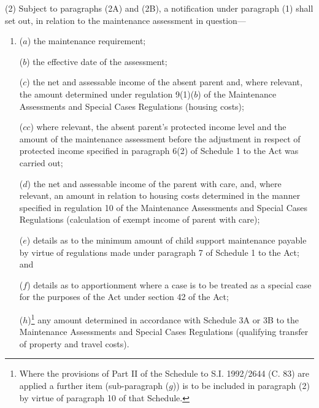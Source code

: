 \documentclass[a4paper]{article}
\begin{document}
(2) 
Subject to 
  paragraphs (2A) and (2B),  %
a notification under paragraph (1)  %
shall set out, in relation to the maintenance assessment in question—
\begin{enumerate}\item[]
($a$) the maintenance requirement;

($b$) the effective date of the assessment;


($c$) the net and assessable income of the absent parent and, where relevant, the amount determined under regulation 9(1)($b$) of the Maintenance Assessments and Special Cases Regulations (housing costs);

($cc$) where relevant, the absent parent’s protected income level and the amount of the maintenance assessment before the adjustment in respect of protected income specified in paragraph 6(2) of Schedule 1 to the Act was carried out;


($d$) the net and assessable income of the parent with care, and, where relevant, an amount in relation to housing costs determined in the manner specified in regulation 10 of the Maintenance Assessments and Special Cases Regulations (calculation of exempt income of parent with care);

($e$) details as to the minimum amount of child support maintenance payable by virtue of regulations made under paragraph 7 of Schedule 1 to the Act; and

($f$) details as to apportionment where a case is to be treated as a special case for the purposes of the Act under section 42 of the Act;

($h$)\footnote{\frenchspacing Where the provisions of Part II of the Schedule to S.I. 1992/2644 (C. 83) are applied a further item (sub-paragraph ($g$)) is to be included in paragraph (2) by virtue of paragraph 10 of that Schedule.} any amount determined in accordance with Schedule 3A or 3B to the Maintenance Assessments and Special Cases Regulations (qualifying transfer of property and travel costs).
\end{enumerate}
\end{document}
